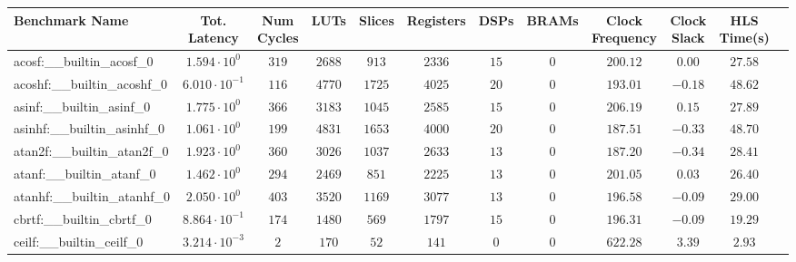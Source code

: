 \begin{tabular}{|l|c|c|c|c|c|c|c|c|c|c|c|}
\hline
Benchmark Name                            & Tot. Latency            & Num Cycles & LUTs      & Slices    & Registers & DSPs    & BRAMs & Clock Frequency & Clock Slack & HLS Time(s) \\
\hline
acosf:\_\_builtin\_acosf\_0               & $ 1.594 \cdot 10^{0}  $ & $ 319    $ & $ 2688  $ & $ 913   $ & $ 2336  $ & $ 15  $ & $ 0 $ & $ 200.12      $ & $ 0.00    $ & $ 27.58   $ \\
acoshf:\_\_builtin\_acoshf\_0             & $ 6.010 \cdot 10^{-1} $ & $ 116    $ & $ 4770  $ & $ 1725  $ & $ 4025  $ & $ 20  $ & $ 0 $ & $ 193.01      $ & $ -0.18   $ & $ 48.62   $ \\
asinf:\_\_builtin\_asinf\_0               & $ 1.775 \cdot 10^{0}  $ & $ 366    $ & $ 3183  $ & $ 1045  $ & $ 2585  $ & $ 15  $ & $ 0 $ & $ 206.19      $ & $ 0.15    $ & $ 27.89   $ \\
asinhf:\_\_builtin\_asinhf\_0             & $ 1.061 \cdot 10^{0}  $ & $ 199    $ & $ 4831  $ & $ 1653  $ & $ 4000  $ & $ 20  $ & $ 0 $ & $ 187.51      $ & $ -0.33   $ & $ 48.70   $ \\
atan2f:\_\_builtin\_atan2f\_0             & $ 1.923 \cdot 10^{0}  $ & $ 360    $ & $ 3026  $ & $ 1037  $ & $ 2633  $ & $ 13  $ & $ 0 $ & $ 187.20      $ & $ -0.34   $ & $ 28.41   $ \\
atanf:\_\_builtin\_atanf\_0               & $ 1.462 \cdot 10^{0}  $ & $ 294    $ & $ 2469  $ & $ 851   $ & $ 2225  $ & $ 13  $ & $ 0 $ & $ 201.05      $ & $ 0.03    $ & $ 26.40   $ \\
atanhf:\_\_builtin\_atanhf\_0             & $ 2.050 \cdot 10^{0}  $ & $ 403    $ & $ 3520  $ & $ 1169  $ & $ 3077  $ & $ 13  $ & $ 0 $ & $ 196.58      $ & $ -0.09   $ & $ 29.00   $ \\
cbrtf:\_\_builtin\_cbrtf\_0               & $ 8.864 \cdot 10^{-1} $ & $ 174    $ & $ 1480  $ & $ 569   $ & $ 1797  $ & $ 15  $ & $ 0 $ & $ 196.31      $ & $ -0.09   $ & $ 19.29   $ \\
ceilf:\_\_builtin\_ceilf\_0               & $ 3.214 \cdot 10^{-3} $ & $ 2      $ & $ 170   $ & $ 52    $ & $ 141   $ & $ 0   $ & $ 0 $ & $ 622.28      $ & $ 3.39    $ & $ 2.93    $ \\

\end{tabular}

